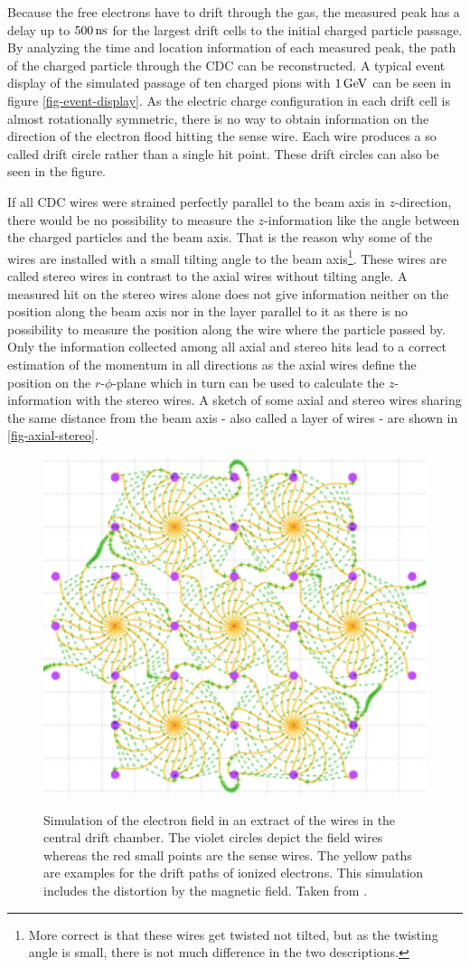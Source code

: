 Because the free electrons have to drift through the gas, the measured peak has a delay up to $\unit[500]{ns}$ for the largest drift cells to the initial charged particle passage. By analyzing the time and location information of each measured peak, the path of the charged particle through the CDC can be reconstructed. A typical event display of the simulated passage of ten charged pions with $\unit[1]{GeV}$ can be seen in figure \ref{fig-event-display}. As the electric charge configuration in each drift cell is almost rotationally symmetric, there is no way to obtain information on the direction of the electron flood hitting the sense wire. Each wire produces a so called drift circle rather than a single hit point. These drift circles can also be seen in the figure.

If all CDC wires were strained perfectly parallel to the beam axis in $z$-direction, there would be no possibility to measure the $z$-information like the angle between the charged particles and the beam axis. That is the reason why some of the wires are installed with a small tilting angle to the beam axis\footnote{More correct is that these wires get twisted not tilted, but as the twisting angle is small, there is not much difference in the two descriptions.}. These wires are called stereo wires in contrast to the axial wires without tilting angle. A measured hit on the stereo wires alone does not give information neither on the position along the beam axis nor in the layer parallel to it as there is no possibility to measure the position along the wire where the particle passed by. Only the information collected among all axial and stereo hits lead to a correct estimation of the momentum in all directions as the axial wires define the position on the $r$-$\phi$-plane which in turn can be used to calculate the $z$-information with the stereo wires. A sketch of some axial and stereo wires sharing the same distance from the beam axis - also called a layer of wires - are shown in \ref{fig-axial-stereo}.

\begin{figure}
  \caption{Simulation of the electron field in an extract of the wires in the central drift chamber. The violet circles depict the field wires whereas the red small points are the sense wires. The yellow paths are examples for the drift paths of ionized electrons. This simulation includes the distortion by the magnetic field. Taken from \cite{cdc_design}.}
  \includegraphics[width=0.5\linewidth]{figures/experimental_setup/electronsInCDC.pdf}
  \label{fig-sense-wires}
\end{figure}


